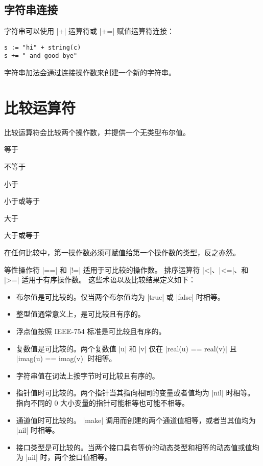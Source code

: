 \subsection{字符串连接}
字符串可以使用 \code|+| 运算符或 \code|+=| 赋值运算符连接：
\begin{lstlisting}[style=golang]
s := "hi" + string(c)
s += " and good bye"
\end{lstlisting}
字符串加法会通过连接操作数来创建一个新的字符串。

\section{比较运算符}
比较运算符会比较两个操作数，并提供一个无类型布尔值。
\begin{description}[style=sameline, leftmargin=2\parindent]
\item[==] 等于
\item[!=] 不等于
\item[<] 小于
\item[<=] 小于或等于
\item[>] 大于
\item[>=] 大于或等于
\end{description}
在任何比较中，第一操作数必须可赋值给第一个操作数的类型，反之亦然。

等性操作符 \code|==| 和 \code|!=| 适用于可比较的操作数。
排序运算符 \code|<|、\code|<=|、和 \code|>=| 适用于有序操作数。
这些术语以及比较结果定义如下：
\begin{itemize}
\item 布尔值是可比较的。仅当两个布尔值均为 \code|true| 或 \code|false| 时相等。
\item 整型值通常意义上，是可比较且有序的。
\item 浮点值按照 IEEE-754 标准是可比较且有序的。
\item 复数值是可比较的。两个复数值 \code|u| 和 \code|v| 仅在 \code|real(u) == real(v)| 且 \code|imag(u) == imag(v)| 时相等。
\item 字符串值在词法上按字节时可比较且有序的。
\item 指针值时可比较的。两个指针当其指向相同的变量或者值均为 \code|nil| 时相等。
指向不同的 0 大小变量的指针可能相等也可能不相等。
\item 通道值时可比较的。 \code|make| 调用而创建的两个通道值相等，或者当其值均为 \code|nil| 时相等。
\item 接口类型是可比较的。当两个接口具有等价的动态类型和相等的动态值或值均为 \code|nil| 时，两个接口值相等。

\end{itemize}




